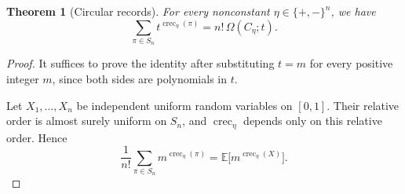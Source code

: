 \documentclass[10pt,a4paper]{amsart}
\newtheorem{theorem}{Theorem}[section]
\begin{document}
\begin{theorem}[Circular records]\label{thm:circular-records}
For every nonconstant \(\eta\in\{+,-\}^n\), we have
\[
\sum_{\pi\in S_n}t^{\operatorname{crec}_\eta(\pi)}
=
n!\,\Omega(C_\eta;t).
\]
\end{theorem}

\begin{proof}
It suffices to prove the identity after substituting \(t=m\) for every positive
integer \(m\), since both sides are polynomials in \(t\).

Let \(X_1,\ldots,X_n\) be independent uniform random variables on \([0,1]\).
Their relative order is almost surely uniform on \(S_n\), and
\(\operatorname{crec}_\eta\) depends only on this relative order.  Hence
\[
\frac1{n!}\sum_{\pi\in S_n}m^{\operatorname{crec}_\eta(\pi)}
=
\mathbb E\bigl[m^{\operatorname{crec}_\eta(X)}\bigr].
\]


\end{proof}
\end{document}
